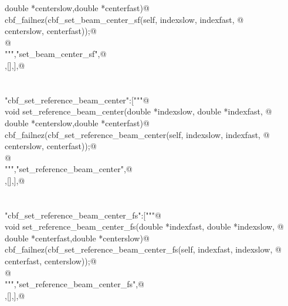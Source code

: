 \documentclass[10pt,a4paper,twoside,notitlepage]{article}
\begin{document}
\begin{flushleft}
\begin{list}{}{}
\mbox{}\verb@                         double *centerslow,double *centerfast){@\\
\mbox{}\verb@        cbf_failnez(cbf_set_beam_center_sf(self, indexslow, indexfast, @\\
\mbox{}\verb@                                       centerslow, centerfast));@\\
\mbox{}\verb@        }@\\
\mbox{}\verb@""","set_beam_center_sf",@\\
\mbox{},[],],@\\
\mbox{}\verb@@\\
\mbox{}\verb@@\\
\mbox{}\verb@"cbf_set_reference_beam_center":["""@\\
\mbox{}\verb@    void set_reference_beam_center(double *indexslow, double *indexfast, @\\
\mbox{}\verb@                         double *centerslow,double *centerfast){@\\
\mbox{}\verb@        cbf_failnez(cbf_set_reference_beam_center(self, indexslow, indexfast, @\\
\mbox{}\verb@                                       centerslow, centerfast));@\\
\mbox{}\verb@        }@\\
\mbox{}\verb@""","set_reference_beam_center",@\\
\mbox{},[],],@\\
\mbox{}\verb@@\\
\mbox{}\verb@@\\
\mbox{}\verb@"cbf_set_reference_beam_center_fs":["""@\\
\mbox{}\verb@    void set_reference_beam_center_fs(double *indexfast, double *indexslow, @\\
\mbox{}\verb@                         double *centerfast,double *centerslow){@\\
\mbox{}\verb@        cbf_failnez(cbf_set_reference_beam_center_fs(self, indexfast, indexslow, @\\
\mbox{}\verb@                                       centerfast, centerslow));@\\
\mbox{}\verb@        }@\\
\mbox{}\verb@""","set_reference_beam_center_fs",@\\
\mbox{},[],],@\\

\end{list}
\end{flushleft}
\end{document}

